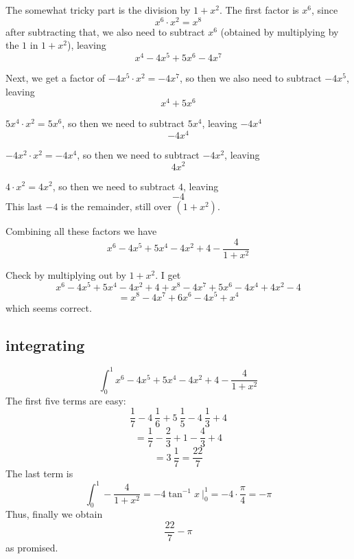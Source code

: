 \documentclass[11pt, oneside]{article}
\begin{document}
The somewhat tricky part is the division by $1 + x^2$.  The first factor is $x^6$, since
\[ x^6 \cdot x^2 = x^8 \]
after subtracting that, we also need to subtract $x^6$ (obtained by multiplying by the $1$ in $1 + x^2$), leaving
\[ x^4 - 4x^5 + 5x^6 - 4x^7 \]

Next, we get a factor of $-4x^5 \cdot x^2 = -4x^7$, so then we also need to subtract $-4x^5$, leaving
\[ x^4 + 5x^6 \]

$5x^4 \cdot x^2 = 5x^6$, so then we need to subtract $5x^4$, leaving $-4x^4$
\[ -4x^4 \]

$-4x^2 \cdot x^2 = -4x^4$, so then we need to subtract $-4x^2$, leaving
\[ 4x^2 \]

$4 \cdot x^2 = 4x^2$, so then we need to subtract $4$, leaving 
\[ -4 \]
This last $-4$ is the remainder, still over $(1 + x^2)$.

Combining all these factors we have
\[ x^6 - 4x^5 + 5x^4 - 4x^2 + 4 - \frac{4}{1 + x^2} \]

Check by multiplying out by $1 + x^2$.  I get
\[ x^6 - 4x^5 + 5x^4 - 4x^2 + 4 + x^8 - 4x^7 + 5x^6 - 4x^4 + 4x^2 - 4 \]
\[ = x^8 - 4x^7 + 6x^6 - 4x^5 + x^4 \]
which seems correct.

\subsection*{integrating}
\[ \int_0^1 x^6 - 4x^5 + 5x^4 - 4x^2 + 4 - \frac{4}{1 + x^2} \]
The first five terms are easy:
\[ \frac{1}{7} - 4 \ \frac{1}{6} + 5 \ \frac{1}{5} - 4 \ \frac{1}{3} + 4 \]
\[ = \frac{1}{7} - \frac{2}{3} + 1 - \frac{4}{3} + 4 \]
\[ = 3 \ \frac{1}{7} = \frac{22}{7}  \]
The last term is
\[ \int_0^1 - \frac{4}{1 + x^2} = -4 \tan^{-1} x \ \bigg |_0^1 = -4 \cdot \frac{\pi}{4} = - \pi \]
Thus, finally we obtain
\[  \frac{22}{7} - \pi \]
as promised.
\end{document}
